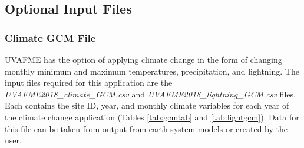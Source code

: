 \documentclass[a4paper, 12pt] {article}
\begin{document}
\subsection{Optional Input Files} \label{optional}

\subsubsection{Climate GCM File}

UVAFME has the option of applying climate change in the form of changing monthly minimum and maximum temperatures, precipitation, and lightning. The input files required for this application are the \\
 \textit{UVAFME2018\_climate\_GCM.csv} and  \textit{UVAFME2018\_lightning\_GCM.csv} files. Each contains the site ID, year, and monthly climate variables for each year of the climate change application (Tables \ref{tab:gcmtab} and \ref{tab:lightgcm}). Data for this file can be taken from output from earth system models or created by the user.

\begin{table}[H]
\caption{\textit{UVAFME2018\_climate\_GCM.csv} file parameters.}
\label{tab:gcmtab}
\end{table}
\end{document}
